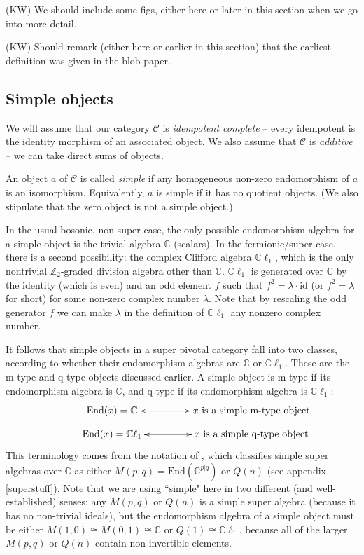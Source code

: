 \documentclass[12pt,a4paper]{article}
\newcommand{\cc}{\mathbb{C}}
\newcommand{\mcc}{\mathcal{C}}
\newcommand{\zt}{\mathbb{Z}_2}
\newcommand{\id}{\text{id}}
\newcommand{\End}{\text{End}}
\newcommand{\cl}{\mathbb{C}\ell}
\newcommand{\kw}[1]{{\color{kwcolor}\footnotesize{(KW) #1}}}
\begin{document}
\kw{We should include some figs, either here or later in this section when we go into more detail.}

\kw{Should remark (either here or earlier in this section) that the earliest definition was given in the blob paper.}




\subsection{Simple objects}  \label{def_sob_ss}

We will assume that our category $\mcc$ is {\it idempotent complete} -- 
every idempotent is the identity morphism of an associated object.
We also assume that $\mcc$ is {\it additive} -- we can take direct sums of objects.

An object $a$ of $\mcc$ is called {\it simple} if any homogeneous non-zero endomorphism of $a$ is an isomorphism.
Equivalently, $a$ is simple if it has no quotient objects.
(We also stipulate that the zero object is not a simple object.)

In the usual bosonic, non-super case, the only possible endomorphism algebra for a simple object
is the trivial algebra $\cc$ (scalars).
In the fermionic/super case, there is a second possibility: the complex Clifford algebra $\cl_1$, 
which is the only nontrivial $\zt$-graded division algebra other than $\cc$.
$\cl_1$ is generated over $\cc$ by the identity (which is even) and an odd element $f$ such that $f^2 = \lambda \cdot \id$
(or $f^2 = \lambda$ for short) for some non-zero complex number $\lambda$. 
Note that by rescaling the odd generator $f$ we can make $\lambda$ in the definition of $\cl_1$ any nonzero complex number. 

It follows that simple objects in a super pivotal category fall into two classes, according to whether their endomorphism algebras are $\cc$ or $\cl_1$. 
These are the m-type and q-type objects discussed earlier. 
A simple object is {m-type} if its endomorphism algebra
is $\cc$, and {q-type} if its endomorphism algebra is $\cl_1$:
\begin{align}
\vcenter{\xymatrix @!0 @M=1mm @C=25mm{
& \text{End}(x) = \mathbb{C} \ar@{<->}[rr] &   &\text{$x$ is a simple m-type object}&  \\
&\text{End}(x) = \mathbb{C} \ell_1 \ar@{<->}[rr]  &  &\text{$x$ is a simple q-type object}&
	}}
\end{align}
This terminology comes from the notation of \cite{jozefiak1988}, which classifies simple super algebras over $\cc$ as either
$M(p,q) = \End(\cc^{p|q})$ or $Q(n)$ (see appendix \ref{superstuff}).
Note that we are using ``simple" here in two different (and well-established) senses: 
any $M(p,q)$ or $Q(n)$ is a simple super algebra
(because it has no non-trivial ideals), but the endomorphism algebra of a simple object must be either
$M(1,0) \cong M(0,1) \cong \cc$ or $Q(1) \cong \cl_1$,
because all of the larger $M(p,q)$ or $Q(n)$ contain non-invertible elements.
\end{document}
